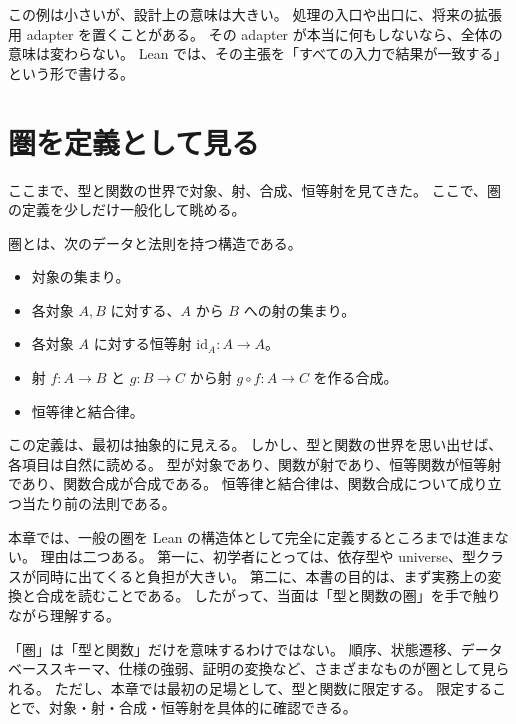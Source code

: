 この例は小さいが、設計上の意味は大きい。
処理の入口や出口に、将来の拡張用 adapter を置くことがある。
その adapter が本当に何もしないなら、全体の意味は変わらない。
Lean では、その主張を「すべての入力で結果が一致する」という形で書ける。


\section{圏を定義として見る}

ここまで、型と関数の世界で対象、射、合成、恒等射を見てきた。
ここで、圏の定義を少しだけ一般化して眺める。

\begin{definitionbox}
圏とは、次のデータと法則を持つ構造である。
\begin{itemize}
\item 対象の集まり。
\item 各対象 \(A, B\) に対する、\(A\) から \(B\) への射の集まり。
\item 各対象 \(A\) に対する恒等射 \(\mathrm{id}_A : A \to A\)。
\item 射 \(f : A \to B\) と \(g : B \to C\) から射 \(g \circ f : A \to C\) を作る合成。
\item 恒等律と結合律。
\end{itemize}
\end{definitionbox}

この定義は、最初は抽象的に見える。
しかし、型と関数の世界を思い出せば、各項目は自然に読める。
型が対象であり、関数が射であり、恒等関数が恒等射であり、関数合成が合成である。
恒等律と結合律は、関数合成について成り立つ当たり前の法則である。

本章では、一般の圏を Lean の構造体として完全に定義するところまでは進まない。
理由は二つある。
第一に、初学者にとっては、依存型や universe、型クラスが同時に出てくると負担が大きい。
第二に、本書の目的は、まず実務上の変換と合成を読むことである。
したがって、当面は「型と関数の圏」を手で触りながら理解する。

\begin{warningbox}
「圏」は「型と関数」だけを意味するわけではない。
順序、状態遷移、データベーススキーマ、仕様の強弱、証明の変換など、さまざまなものが圏として見られる。
ただし、本章では最初の足場として、型と関数に限定する。
限定することで、対象・射・合成・恒等射を具体的に確認できる。
\end{warningbox}

